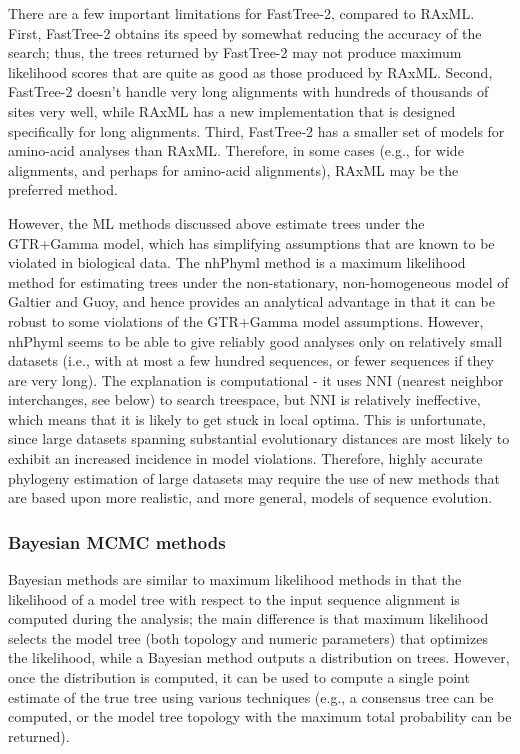 There are a few important limitations for FastTree-2, 
compared to RAxML. First, FastTree-2 obtains its speed by 
somewhat reducing the accuracy of the search; thus, the 
trees returned by FastTree-2 may not produce maximum 
likelihood scores that are quite as good as those produced 
by RAxML. Second, FastTree-2 doesn't handle very long 
alignments with hundreds of thousands of sites very well, 
while RAxML has a new implementation that is designed 
specifically for long alignments. Third, FastTree-2 has a 
smaller set of models for amino-acid analyses than RAxML. 
Therefore, in some cases (e.g., for wide alignments, 
and perhaps for amino-acid alignments), RAxML may 
be the preferred method. 

However, the ML methods discussed above estimate trees under 
the GTR+Gamma model, which has simplifying assumptions that 
are known to be violated in biological data. 
The nhPhyml method is a maximum likelihood method for 
estimating trees under the non-stationary, non-homogeneous 
model of Galtier and Guoy, and hence provides an 
analytical advantage in that it can be robust to some 
violations of the GTR+Gamma model assumptions. However, 
nhPhyml seems to be able to give reliably good analyses 
only on relatively small datasets (i.e., with at most a 
few hundred sequences, or fewer sequences if they are very long). 
The explanation is computational - it uses NNI 
(nearest neighbor interchanges, see below) to search treespace, 
but NNI is relatively ineffective, which means that it is 
likely to get stuck in local optima. This is unfortunate, 
since large datasets spanning substantial evolutionary 
distances are most likely to exhibit an increased incidence 
in model violations. Therefore, highly accurate phylogeny 
estimation of large datasets may require the use of new 
methods that are based upon more realistic, and more general, 
models of sequence evolution.

\subsubsection{Bayesian MCMC methods}
Bayesian methods are similar to maximum likelihood methods 
in that the likelihood of a model tree with respect to the 
input sequence alignment is computed during the analysis; 
the main difference is that maximum likelihood selects the 
model tree (both topology and numeric parameters) that 
optimizes the likelihood, while a Bayesian method outputs a 
distribution on trees. However, once the distribution is 
computed, it can be used to compute a single point estimate 
of the true tree using various techniques (e.g., a consensus 
tree can be computed, or the model tree topology with the 
maximum total probability can be returned).

